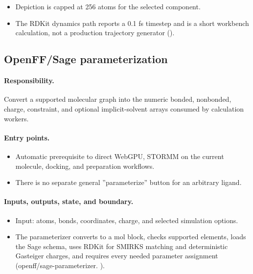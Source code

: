\documentclass[11pt]{article}
\begin{document}
\begin{small}
\begin{itemize}[leftmargin=*]
\item Depiction is capped at 256 atoms for the selected component.

\item The RDKit dynamics path reports a 0.1 fs timestep and is a short workbench calculation, not a production trajectory generator ().

\end{itemize}

\subsection{OpenFF/Sage parameterization}\label{appB:sec10}

\paragraph{Responsibility.}

Convert a supported molecular graph into the numeric bonded, nonbonded, charge, constraint, and optional implicit-solvent arrays consumed by calculation workers.

\paragraph{Entry points.}

\begin{itemize}[leftmargin=*]

\item Automatic prerequisite to direct WebGPU, STORMM on the current molecule, docking, and preparation workflows.

\item There is no separate general ''parameterize'' button for an arbitrary ligand.

\end{itemize}

\paragraph{Inputs, outputs, state, and boundary.}

\begin{itemize}[leftmargin=*]

\item Input: atoms, bonds, coordinates, charge, and selected simulation options.

\item The parameterizer converts to a mol block, checks supported elements, loads the Sage schema, uses RDKit for SMIRKS matching and deterministic Gasteiger charges, and requires every needed parameter assignment (openff/sage-parameterizer. ).


\end{itemize}
\end{small}
\end{document}
